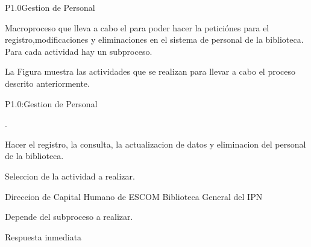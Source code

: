 




\begin{Proceso}{P1.0}{Gestion de Personal} {
  
Macroproceso que lleva a cabo el  para poder hacer la peticiónes para el registro,modificaciones y eliminaciones en el sistema de personal de la biblioteca. Para cada actividad hay un subproceso.
 



  \noindent La Figura  muestra las actividades que se realizan para llevar a cabo el proceso descrito anteriormente.


} {P1.0:Gestion de Personal}


   { %
    .
  }

   { %
    Hacer el registro, la consulta, la actualizacion de datos y eliminacion del personal de la biblioteca.
  }

   { %
	 Seleccion de la actividad a realizar.
  }
  
   { %
  \begin{UClist}
  		\UCli Direccion de Capital Humano de ESCOM
    	\UCli Biblioteca General del IPN
    \end {UClist}
    
  }

   { %
    \begin{UClist}
    
      \UCli Depende del subproceso a realizar.
    \end{UClist}
  }

   { %
  }

   { %
    \begin{UClist}
      \UCli Respuesta inmediata
      
    \end{UClist}
  }


\end{Proceso}

